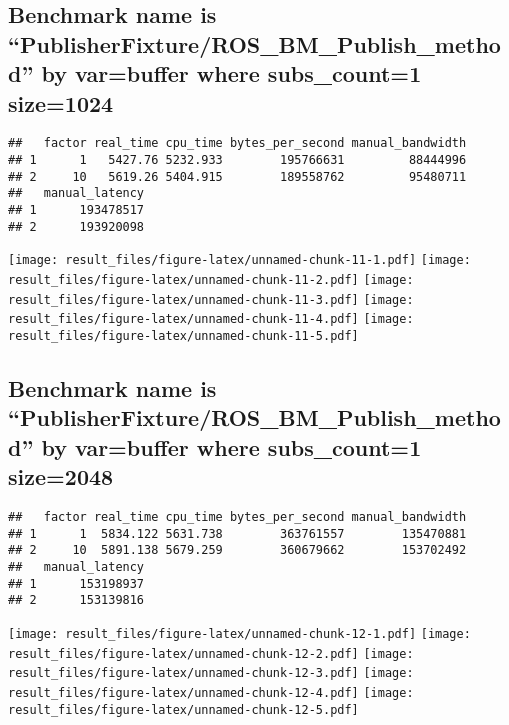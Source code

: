 \documentclass[]{article}
\begin{document}
\hypertarget{benchmark-name-is-publisherfixtureros_bm_publish_method-by-varbuffer-where-subs_count1-size1024}{%
\subsection{Benchmark name is
``PublisherFixture/ROS\_BM\_Publish\_method'' by var=buffer where
subs\_count=1
size=1024}\label{benchmark-name-is-publisherfixtureros_bm_publish_method-by-varbuffer-where-subs_count1-size1024}}

\begin{verbatim}
##   factor real_time cpu_time bytes_per_second manual_bandwidth
## 1      1   5427.76 5232.933        195766631         88444996
## 2     10   5619.26 5404.915        189558762         95480711
##   manual_latency
## 1      193478517
## 2      193920098
\end{verbatim}

\texttt{[image: result\_files/figure-latex/unnamed-chunk-11-1.pdf]}
\texttt{[image: result\_files/figure-latex/unnamed-chunk-11-2.pdf]}
\texttt{[image: result\_files/figure-latex/unnamed-chunk-11-3.pdf]}
\texttt{[image: result\_files/figure-latex/unnamed-chunk-11-4.pdf]}
\texttt{[image: result\_files/figure-latex/unnamed-chunk-11-5.pdf]}

\hypertarget{benchmark-name-is-publisherfixtureros_bm_publish_method-by-varbuffer-where-subs_count1-size2048}{%
\subsection{Benchmark name is
``PublisherFixture/ROS\_BM\_Publish\_method'' by var=buffer where
subs\_count=1
size=2048}\label{benchmark-name-is-publisherfixtureros_bm_publish_method-by-varbuffer-where-subs_count1-size2048}}

\begin{verbatim}
##   factor real_time cpu_time bytes_per_second manual_bandwidth
## 1      1  5834.122 5631.738        363761557        135470881
## 2     10  5891.138 5679.259        360679662        153702492
##   manual_latency
## 1      153198937
## 2      153139816
\end{verbatim}

\texttt{[image: result\_files/figure-latex/unnamed-chunk-12-1.pdf]}
\texttt{[image: result\_files/figure-latex/unnamed-chunk-12-2.pdf]}
\texttt{[image: result\_files/figure-latex/unnamed-chunk-12-3.pdf]}
\texttt{[image: result\_files/figure-latex/unnamed-chunk-12-4.pdf]}
\texttt{[image: result\_files/figure-latex/unnamed-chunk-12-5.pdf]}
\end{document}
